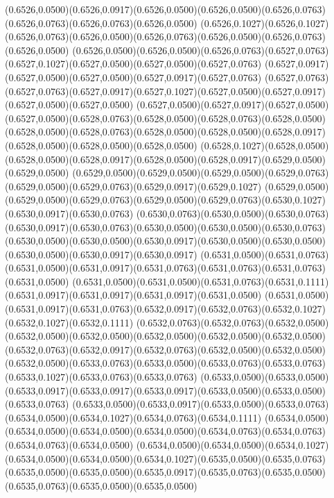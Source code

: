 (0.6526,0.0500)(0.6526,0.0917)(0.6526,0.0500)(0.6526,0.0500)(0.6526,0.0763)(0.6526,0.0763)(0.6526,0.0763)(0.6526,0.0500)
(0.6526,0.1027)(0.6526,0.1027)(0.6526,0.0763)(0.6526,0.0500)(0.6526,0.0763)(0.6526,0.0500)(0.6526,0.0763)(0.6526,0.0500)
(0.6526,0.0500)(0.6526,0.0500)(0.6526,0.0763)(0.6527,0.0763)(0.6527,0.1027)(0.6527,0.0500)(0.6527,0.0500)(0.6527,0.0763)
(0.6527,0.0917)(0.6527,0.0500)(0.6527,0.0500)(0.6527,0.0917)(0.6527,0.0763)
\PST@Solid(0.6527,0.0763)(0.6527,0.0763)(0.6527,0.0917)(0.6527,0.1027)(0.6527,0.0500)(0.6527,0.0917)(0.6527,0.0500)(0.6527,0.0500)
(0.6527,0.0500)(0.6527,0.0917)(0.6527,0.0500)(0.6527,0.0500)(0.6528,0.0763)(0.6528,0.0500)(0.6528,0.0763)(0.6528,0.0500)
(0.6528,0.0500)(0.6528,0.0763)(0.6528,0.0500)(0.6528,0.0500)(0.6528,0.0917)(0.6528,0.0500)(0.6528,0.0500)(0.6528,0.0500)
(0.6528,0.1027)(0.6528,0.0500)(0.6528,0.0500)(0.6528,0.0917)(0.6528,0.0500)(0.6528,0.0917)(0.6529,0.0500)(0.6529,0.0500)
(0.6529,0.0500)(0.6529,0.0500)(0.6529,0.0500)(0.6529,0.0763)(0.6529,0.0500)(0.6529,0.0763)(0.6529,0.0917)(0.6529,0.1027)
(0.6529,0.0500)(0.6529,0.0500)(0.6529,0.0763)(0.6529,0.0500)(0.6529,0.0763)(0.6530,0.1027)(0.6530,0.0917)(0.6530,0.0763)
(0.6530,0.0763)(0.6530,0.0500)(0.6530,0.0763)(0.6530,0.0917)(0.6530,0.0763)(0.6530,0.0500)(0.6530,0.0500)(0.6530,0.0763)
(0.6530,0.0500)(0.6530,0.0500)(0.6530,0.0917)(0.6530,0.0500)(0.6530,0.0500)(0.6530,0.0500)(0.6530,0.0917)(0.6530,0.0917)
(0.6531,0.0500)(0.6531,0.0763)(0.6531,0.0500)(0.6531,0.0917)(0.6531,0.0763)(0.6531,0.0763)(0.6531,0.0763)(0.6531,0.0500)
(0.6531,0.0500)(0.6531,0.0500)(0.6531,0.0763)(0.6531,0.1111)(0.6531,0.0917)(0.6531,0.0917)(0.6531,0.0917)(0.6531,0.0500)
(0.6531,0.0500)(0.6531,0.0917)(0.6531,0.0763)(0.6532,0.0917)(0.6532,0.0763)(0.6532,0.1027)(0.6532,0.1027)(0.6532,0.1111)
(0.6532,0.0763)(0.6532,0.0763)(0.6532,0.0500)(0.6532,0.0500)(0.6532,0.0500)(0.6532,0.0500)(0.6532,0.0500)(0.6532,0.0500)
(0.6532,0.0763)(0.6532,0.0917)(0.6532,0.0763)(0.6532,0.0500)(0.6532,0.0500)
\PST@Solid(0.6532,0.0500)(0.6533,0.0763)(0.6533,0.0500)(0.6533,0.0763)(0.6533,0.0763)(0.6533,0.1027)(0.6533,0.0763)(0.6533,0.0763)
(0.6533,0.0500)(0.6533,0.0500)(0.6533,0.0917)(0.6533,0.0917)(0.6533,0.0917)(0.6533,0.0500)(0.6533,0.0500)(0.6533,0.0763)
(0.6533,0.0500)(0.6533,0.0917)(0.6533,0.0500)(0.6533,0.0763)(0.6534,0.0500)(0.6534,0.1027)(0.6534,0.0763)(0.6534,0.1111)
(0.6534,0.0500)(0.6534,0.0500)(0.6534,0.0500)(0.6534,0.0500)(0.6534,0.0763)(0.6534,0.0763)(0.6534,0.0763)(0.6534,0.0500)
(0.6534,0.0500)(0.6534,0.0500)(0.6534,0.1027)(0.6534,0.0500)(0.6534,0.0500)(0.6534,0.1027)(0.6535,0.0500)(0.6535,0.0763)
(0.6535,0.0500)(0.6535,0.0500)(0.6535,0.0917)(0.6535,0.0763)(0.6535,0.0500)(0.6535,0.0763)(0.6535,0.0500)(0.6535,0.0500)
